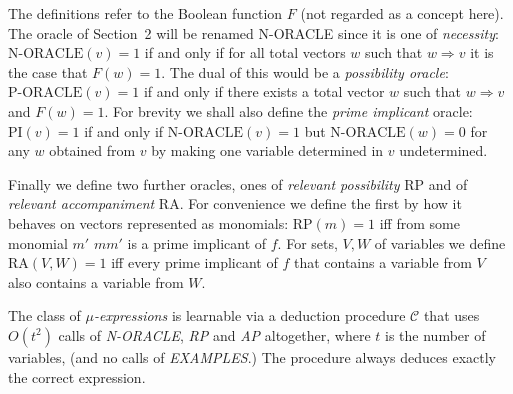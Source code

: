 The definitions refer to the Boolean function $F$ (not regarded as a concept here). The oracle of Section~2 will be renamed N-ORACLE since it is one of \emph{necessity}: $\text{N-ORACLE}(v) = 1$ if and only if for all total vectors $w$ such that $w \Rightarrow v$ it is the case that $F(w) = 1$. The dual of this would be a \emph{possibility oracle}: $\text{P-ORACLE}(v) = 1$ if and only if there exists a total vector $w$ such that $w \Rightarrow v$ and $F(w) = 1$. For brevity we shall also define the \emph{prime implicant} oracle: $\text{PI}(v) = 1$ if and only if $\text{N-ORACLE}(v) = 1$ but $\text{N-ORACLE}(w) = 0$ for any $w$ obtained from $v$ by making one variable determined in $v$ undetermined.

Finally we define two further oracles, ones of \emph{relevant possibility} RP and of \emph{relevant accompaniment} RA. For convenience we define the first by how it behaves on vectors represented as monomials: $\text{RP}(m) = 1$ iff from some monomial $m'$ $mm'$ is a prime implicant of $f$. For sets, $V, W$ of variables we define $\text{RA}(V, W) = 1$ iff every prime implicant of $f$ that contains a variable from $V$ also contains a variable from $W$.

\begin{theorem}[Theorem C]
The class of \emph{$\mu$-expressions} is learnable via a deduction procedure $\mathcal{C}$ that uses $O(t^2)$ calls of \emph{N-ORACLE}, \emph{RP} and \emph{AP} altogether, where $t$ is the number of variables, (and no calls of \emph{EXAMPLES}.) The procedure always deduces exactly the correct expression.
\end{theorem}

